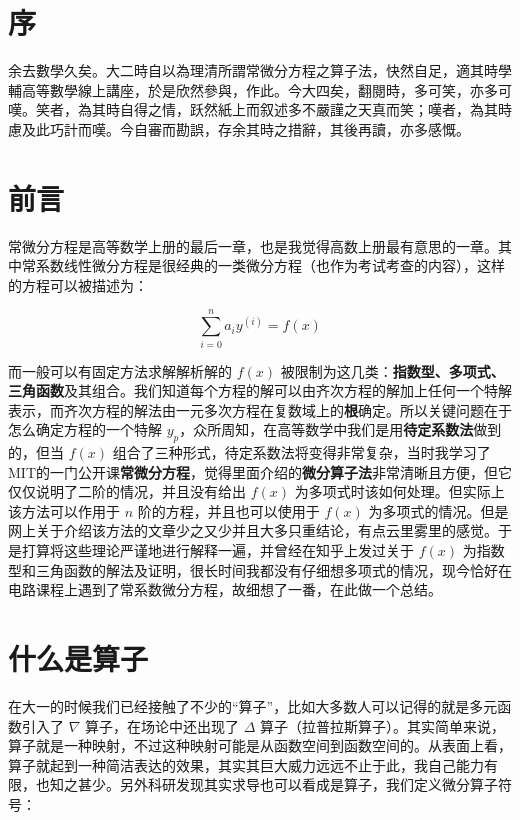 \documentclass{article}
\date{}
\begin{document}
\makecover

\section*{序}

余去數學久矣。大二時自以為理清所謂常微分方程之算子法，快然自足，適其時學輔高等數學線上講座，於是欣然參與，作此。今大四矣，翻閱時，多可笑，亦多可嘆。笑者，為其時自得之情，跃然紙上而叙述多不嚴謹之天真而笑；嘆者，為其時慮及此巧計而嘆。今自審而勘誤，存余其時之措辭，其後再讀，亦多感慨。

\section{前言}

\noindent 常微分方程是高等数学上册的最后一章，也是我觉得高数上册最有意思的一章。其中常系数线性微分方程是很经典的一类微分方程（也作为考试考查的内容），这样的方程可以被描述为：

$$
\sum_{i = 0}^{n} a_i y^{(i)} = f(x)
$$

\noindent 而一般可以有固定方法求解解析解的 $f(x)$ 被限制为这几类：\textbf{指数型、多项式、三角函数}及其组合。我们知道每个方程的解可以由齐次方程的解加上任何一个特解表示，而齐次方程的解法由一元多次方程在复数域上的\textbf{根}确定。所以关键问题在于怎么确定方程的一个特解 $y_p$，众所周知，在高等数学中我们是用\textbf{待定系数法}做到的，但当 $f(x)$ 组合了三种形式，待定系数法将变得非常复杂，当时我学习了MIT的一门公开课\textbf{常微分方程}，觉得里面介绍的\textbf{微分算子法}非常清晰且方便，但它仅仅说明了二阶的情况，并且没有给出 $f(x)$ 为多项式时该如何处理。但实际上该方法可以作用于 $n$ 阶的方程，并且也可以使用于 $f(x)$ 为多项式的情况。但是网上关于介绍该方法的文章少之又少并且大多只重结论，有点云里雾里的感觉。于是打算将这些理论严谨地进行解释一遍，并曾经在知乎上发过关于 $f(x)$ 为指数型和三角函数的解法及证明，很长时间我都没有仔细想多项式的情况，现今恰好在电路课程上遇到了常系数微分方程，故细想了一番，在此做一个总结。

\section{什么是算子}

\noindent 在大一的时候我们已经接触了不少的“算子”，比如大多数人可以记得的就是多元函数引入了 $\nabla$ 算子，在场论中还出现了 $\Delta$ 算子（拉普拉斯算子）。其实简单来说，算子就是一种映射，不过这种映射可能是从函数空间到函数空间的。从表面上看，算子就起到一种简洁表达的效果，其实其巨大威力远远不止于此，我自己能力有限，也知之甚少。另外科研发现其实求导也可以看成是算子，我们定义微分算子符号：
\end{document}
